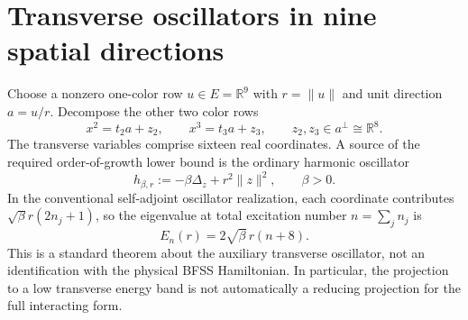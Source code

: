\section{Transverse oscillators in nine spatial directions}
Choose a nonzero one-color row $u\in E=\mathbb R^9$ with $r=\|u\|$
and unit direction $a=u/r$. Decompose the other two color rows
\begin{equation}\label{eq:spectral-onecolor}
  x^2=t_2a+z_2,\qquad x^3=t_3a+z_3,
  \qquad z_2,z_3\in a^\perp\cong\mathbb R^8.
\end{equation}
The transverse variables comprise sixteen real coordinates. A source
of the required order-of-growth lower bound is the ordinary harmonic
oscillator
\begin{equation}\label{eq:transverse-oscillator}
  h_{\beta,r}:=-\beta\Delta_{z}+r^2\|z\|^2,
  \qquad \beta>0.
\end{equation}
In the conventional self-adjoint oscillator realization, each
coordinate contributes $\sqrt\beta r(2n_j+1)$, so the eigenvalue at
total excitation number $n=\sum_jn_j$ is
\begin{equation}\label{eq:oscillator-level}
  E_n(r)=2\sqrt\beta\,r(n+8).
\end{equation}
This is a standard theorem about the auxiliary transverse oscillator,
not an identification with the physical BFSS Hamiltonian. In
particular, the projection to a low transverse energy band is not
automatically a reducing projection for the full interacting form.

